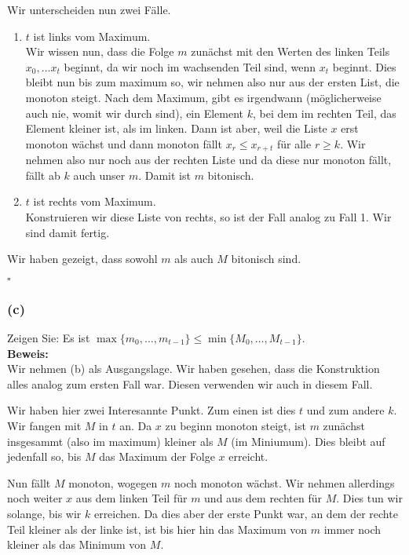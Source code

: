 \documentclass[11pt,a4paper,ngerman]{article}
\begin{document}
Wir unterscheiden nun zwei Fälle.
\begin{enumerate}[1.]
	\item $t$ ist links vom Maximum.\\
		Wir wissen nun, dass die Folge $m$ zunächst mit den Werten des linken Teils $x_0, \ldots x_t$ beginnt, da wir noch im wachsenden Teil
		sind, wenn $x_t$ beginnt. Dies bleibt nun bis zum maximum so, wir nehmen also nur aus der ersten List, die monoton steigt.
		Nach dem Maximum, gibt es irgendwann (möglicherweise auch nie, womit wir durch sind), ein Element $k$, bei dem im rechten Teil,
		das Element kleiner ist, als im linken.
		Dann ist aber, weil die Liste $x$ erst monoton wächst und dann monoton fällt $x_{r} \leq x_{r+t}$ für alle $r \geq k$.
		Wir nehmen also nur noch aus der rechten Liste und da diese nur monoton fällt, fällt ab $k$ auch unser $m$.
		Damit ist $m$ bitonisch.
	\item $t$ ist rechts vom Maximum.\\
		 Konstruieren wir diese Liste von rechts, so ist der Fall analog zu Fall 1. Wir sind damit fertig.
\end{enumerate}

Wir haben gezeigt, dass sowohl $m$ als auch $M$ bitonisch sind.

\mbox{}\hfill$\square$

\subsubsection*{(c)}
Zeigen Sie: Es ist $\max \{ m_0 , \ldots, m_{t-1}\} \leq \min \{ M_0, \ldots, M_{t-1}\}$.\\

\noindent\textbf{Beweis:}\\

Wir nehmen (b) als Ausgangslage. Wir haben gesehen, dass die Konstruktion alles analog zum ersten Fall war. Diesen verwenden wir auch in diesem Fall.

Wir haben hier zwei Interesannte Punkt. Zum einen ist dies $t$ und zum andere $k$. Wir fangen mit $M$ in $t$ an. Da $x$ zu beginn monoton steigt, ist $m$ zunächst insgesammt (also im maximum) kleiner als $M$ (im Miniumum). Dies bleibt auf jedenfall so, bis $M$ das Maximum der Folge $x$ erreicht.

Nun fällt $M$ monoton, wogegen $m$ noch monoton wächst. Wir nehmen allerdings noch weiter $x$ aus dem linken Teil für $m$ und aus dem rechten für $M$. Dies tun wir solange, bis wir $k$ erreichen. Da dies aber der erste Punkt war, an dem der rechte Teil kleiner als der linke ist, ist bis hier hin
das Maximum von $m$ immer noch kleiner als das Minimum von $M$.
\end{document}

